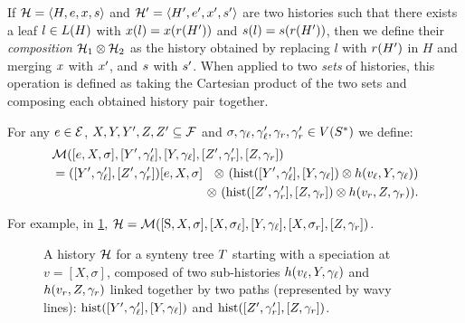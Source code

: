 \begin{definition}
    If \(\mathcal{H} = \left\langle H, e, x, s\right\rangle\)
    and \(\mathcal{H}' = \left\langle H', e', x', s'\right\rangle\) are two histories 
    such that there exists a leaf \(l \in L(H)\) with \(x(l) = x(r(H'))\) and \(s(l) = s(r(H'))\),
    then we define their \emph{composition} \(\mathcal{H}_1 \otimes \mathcal{H}_2\) as the history obtained by replacing \(l\) with \(r(H')\) in \(H\) and merging \(x\) with \(x'\), and \(s\) with \(s'\).
    When applied to two \emph{sets} of histories, this operation is defined as taking the Cartesian product of the two sets and composing each obtained history pair together.

    For any \(e \in \mathcal{E}\), \(X, Y, Y', Z, Z' \subseteq \mathcal{F}\) and \(\sigma, \gamma_\mathit{\ell}, \gamma_\mathit{\ell}', \gamma_r, \gamma_r' \in V(S^*)\) we define:
    \begin{align*}
        &\mathcal{M}([e, X, \sigma], [Y', \gamma_\mathit{\ell}'], [Y, \gamma_\mathit{\ell}], [Z', \gamma_r'], [Z, \gamma_r])\\
        &= ([Y', \gamma_\mathit{\ell}'], [Z', \gamma_r'])[e, X, \sigma] \ \begin{aligned}[t]
            \otimes \ (\mathrm{hist}([Y', \gamma_\mathit{\ell}'], [Y, \gamma_\mathit{\ell}])
            \otimes h(v_\mathit{\ell}, Y, \gamma_\mathit{\ell})) \\
            \otimes \ (\mathrm{hist}([Z', \gamma_r'], [Z, \gamma_r])
            \otimes h(v_r, Z, \gamma_r)).
        \end{aligned}
    \end{align*}
\end{definition}

For example, in \cref{fig:synesth:history-builder},
\(\mathcal{H} = \mathcal{M}([\mathrm{S}, X, \sigma], [X, \sigma_\mathit{\ell}], [Y, \gamma_\mathit{\ell}], [X, \sigma_r], [Z, \gamma_r])\).

\begin{figure}[htb]
    \capstart
    \centering
    
    \caption[Decomposition of a history into sub-histories and paths]{
        A history \(\mathcal{H}\) for a synteny tree \(T\) starting with a speciation at \(v = [X, \sigma]\), composed of two sub-histories \(h(v_\mathit{\ell}, Y, \gamma_\mathit{\ell})\) and \(h(v_r, Z, \gamma_r)\)
        linked together by two paths (represented by wavy lines):
        \(\mathrm{hist}([Y', \gamma_\mathit{\ell}'], [Y, \gamma_\mathit{\ell}])\)
        and \(\mathrm{hist}([Z', \gamma_r'], [Z, \gamma_r])\).
        \label{fig:synesth:history-builder}
    }
\end{figure}

